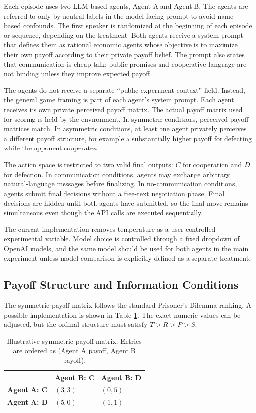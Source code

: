 \documentclass[12pt,a4paper]{article}
\begin{document}
Each episode uses two LLM-based agents, Agent A and Agent B. The agents are referred to only by neutral labels in the model-facing prompt to avoid name-based confounds. The first speaker is randomized at the beginning of each episode or sequence, depending on the treatment. Both agents receive a system prompt that defines them as rational economic agents whose objective is to maximize their own payoff according to their private payoff belief. The prompt also states that communication is cheap talk: public promises and cooperative language are not binding unless they improve expected payoff.

The agents do not receive a separate ``public experiment context'' field. Instead, the general game framing is part of each agent's system prompt. Each agent receives its own private perceived payoff matrix. The actual payoff matrix used for scoring is held by the environment. In symmetric conditions, perceived payoff matrices match. In asymmetric conditions, at least one agent privately perceives a different payoff structure, for example a substantially higher payoff for defecting while the opponent cooperates.

The action space is restricted to two valid final outputs: $C$ for cooperation and $D$ for defection. In communication conditions, agents may exchange arbitrary natural-language messages before finalizing. In no-communication conditions, agents submit final decisions without a free-text negotiation phase. Final decisions are hidden until both agents have submitted, so the final move remains simultaneous even though the API calls are executed sequentially.

The current implementation removes temperature as a user-controlled experimental variable. Model choice is controlled through a fixed dropdown of OpenAI models, and the same model should be used for both agents in the main experiment unless model comparison is explicitly defined as a separate treatment.

\subsection{Payoff Structure and Information Conditions}

The symmetric payoff matrix follows the standard Prisoner's Dilemma ranking. A possible implementation is shown in Table \ref{tab:payoff}. The exact numeric values can be adjusted, but the ordinal structure must satisfy $T > R > P > S$.

\begin{table}[h!]
\centering
\caption{Illustrative symmetric payoff matrix. Entries are ordered as (Agent A payoff, Agent B payoff).}
\label{tab:payoff}
\begin{tabular}{lll}
\toprule
 & \textbf{Agent B: C} & \textbf{Agent B: D} \\
\midrule
\textbf{Agent A: C} & $(3,3)$ & $(0,5)$ \\
\textbf{Agent A: D} & $(5,0)$ & $(1,1)$ \\
\bottomrule
\end{tabular}
\end{table}
\end{document}
